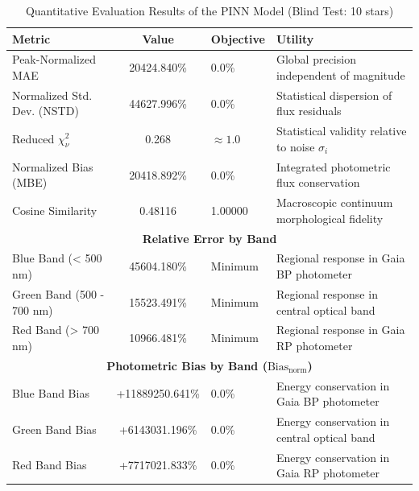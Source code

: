 
\begin{table}[htpb]
\centering
\caption{Quantitative Evaluation Results of the PINN Model (Blind Test: 10 stars)}
\label{tab:pinn_evaluation}
\begin{tabular}{lcll}
\hline
\textbf{Metric} & \textbf{Value} & \textbf{Objective} & \textbf{Utility} \\
\hline
Peak-Normalized MAE & 20424.840\% & 0.0\% & Global precision independent of magnitude \\
Normalized Std. Dev. (NSTD) & 44627.996\% & 0.0\% & Statistical dispersion of flux residuals \\
Reduced $\chi^2_\nu$ & 0.268 & $\approx 1.0$ & Statistical validity relative to noise $\sigma_i$ \\
Normalized Bias (MBE) & 20418.892\% & 0.0\% & Integrated photometric flux conservation \\
Cosine Similarity & 0.48116 & 1.00000 & Macroscopic continuum morphological fidelity \\
\hline
\multicolumn{4}{c}{\textbf{Relative Error by Band}} \\
\hline
Blue Band (< 500 nm) & 45604.180\% & Minimum & Regional response in Gaia BP photometer \\
Green Band (500 - 700 nm) & 15523.491\% & Minimum & Regional response in central optical band \\
Red Band (> 700 nm) & 10966.481\% & Minimum & Regional response in Gaia RP photometer \\
\hline
\multicolumn{4}{c}{\textbf{Photometric Bias by Band ($\text{Bias}_{\text{norm}}$)}} \\
\hline
Blue Band Bias & +11889250.641\% & 0.0\% & Energy conservation in Gaia BP photometer \\
Green Band Bias & +6143031.196\% & 0.0\% & Energy conservation in central optical band \\
Red Band Bias & +7717021.833\% & 0.0\% & Energy conservation in Gaia RP photometer \\
\hline
\end{tabular}
\end{table}
